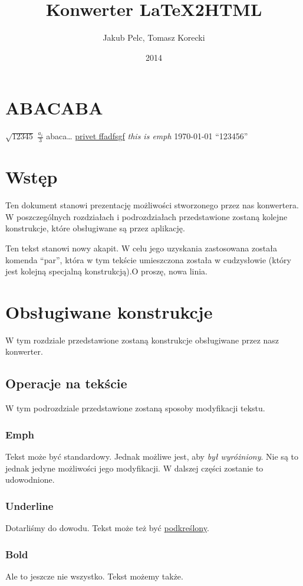 \documentclass{article}
\title{Konwerter LaTeX2HTML}
\author{Jakub Pelc, Tomasz Korecki}
\date{2014}
\begin{document}
    \section{ABACABA}
    $ \sqrt {12345} $
    $ \frac { a_i } { 3 } $
    \newline
    abaca\parhaha \ldots
    \textcelsius
    \underline{privet ffadfsgf}
    \emph { this is emph}
    \today
    ``123456''

    \section{Wstęp}
    Ten dokument stanowi prezentację możliwości stworzonego przez nas konwertera. W poszczególnych rozdziałach i podrozdziałach przedstawione zostaną kolejne konstrukcje, które obsługiwane są przez aplikację.\par
    Ten tekst stanowi nowy akapit. W celu jego uzyskania zastosowana została komenda ``par'', która w tym tekście umieszczona została w cudzysłowie (który jest kolejną specjalną konstrukcją).\newline O proszę, nowa linia.

    \section{Obsługiwane konstrukcje}
    W tym rozdziale przedstawione zostaną konstrukcje obsługiwane przez nasz konwerter.

    \subsection{Operacje na tekście}
    W tym podrozdziale przedstawione zostaną sposoby modyfikacji tekstu.

    \subsubsection{Emph}
    Tekst może być standardowy. Jednak możliwe jest, aby \emph{był wyróżniony}. Nie są to jednak jedyne możliwości jego modyfikacji. W dalszej części zostanie to udowodnione.

    \subsubsection{Underline}
    Dotarliśmy do dowodu. Tekst może też być \underline{podkreślony}.

    \subsubsection{Bold}
    Ale to jeszcze nie wszystko. Tekst możemy także.
\end{document}
